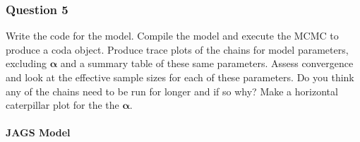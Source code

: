 \documentclass[
]{article}
\begin{document}
\hypertarget{question-5-1}{%
\subsubsection{Question 5}\label{question-5-1}}

Write the code for the model. Compile the model and execute the MCMC to
produce a coda object. Produce trace plots of the chains for model
parameters, excluding \(\boldsymbol{\alpha}\) and a summary table of
these same parameters. Assess convergence and look at the effective
sample sizes for each of these parameters. Do you think any of the
chains need to be run for longer and if so why? Make a horizontal
caterpillar plot for the the \(\boldsymbol{\alpha}\).

\hypertarget{jags-model-1}{%
\paragraph{JAGS Model}\label{jags-model-1}}
\end{document}
